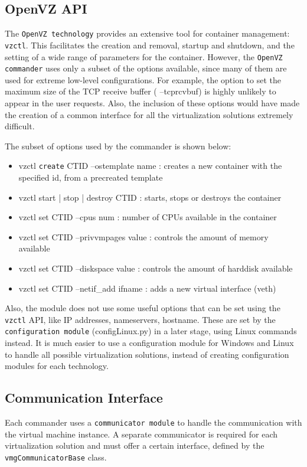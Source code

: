 \subsection{OpenVZ API} \label{sec:openvz-api}
The \texttt{OpenVZ technology} provides an extensive tool for container 
management: \texttt{vzctl}\cite{vzctl}. This facilitates the creation and removal, 
startup and shutdown, and the setting of a wide range of parameters for 
the container\cite{guide}. However, the \texttt{OpenVZ commander} uses only a 
subset of the options available, since many of them are used for extreme 
low-level configurations. For example, the option to set the maximum size 
of the TCP receive buffer ( --tcprcvbuf) is highly unlikely to appear in the 
user requests. Also, the inclusion of these options would have made the 
creation of a common interface for all the virtualization solutions extremely 
difficult.

The subset of options used by the commander is shown below:
\begin{itemize}
  \item vzctl \texttt{create} CTID --ostemplate name : creates a new container with the specified 
id, from a precreated template
  \item vzctl start | stop | destroy CTID : starts, stops or destroys the container
  \item vzctl set CTID --cpus num : number of CPUs available in the container
  \item vzctl set CTID --privvmpages value : controls the amount of memory available
  \item vzctl set CTID --diskspace value : controls the amount of harddisk available
  \item vzctl set CTID --netif_add ifname : adds a new virtual interface (veth)
\end{itemize}

Also, the module does not use some useful options that can be set using the \texttt{vzctl} 
API, like IP addresses, nameservers, hostname. These are set by the \texttt{configuration 
module} (configLinux.py)  in a later stage, using Linux commands instead. It is much easier 
to use a configuration module for Windows and Linux to handle all possible virtualization 
solutions, instead of creating configuration modules for each technology.

\subsection{Communication Interface} \label{sec:openvz-comm}
Each commander uses a \texttt{communicator module} to handle the communication with the 
virtual machine instance. A separate communicator is required for each virtualization solution 
and must offer a certain interface, defined by the \texttt{vmgCommunicatorBase} class.


